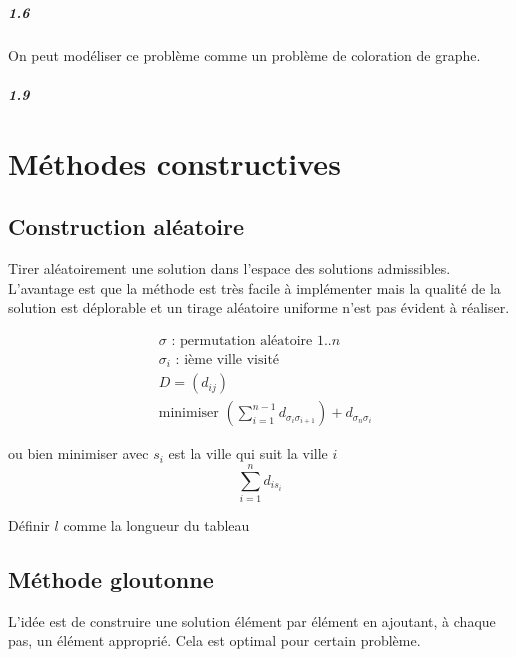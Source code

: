 \documentclass[11pt,a4paper]{report}
\begin{document}
\paragraph*{1.6} On peut modéliser ce problème comme un problème de coloration de graphe.

\paragraph*{1.9} 

\chapter{Méthodes constructives}

\section{Construction aléatoire}
Tirer aléatoirement une solution dans l'espace des solutions admissibles. L'avantage est que la méthode est très facile à implémenter mais la qualité de la solution est déplorable et un tirage aléatoire uniforme n'est pas évident à réaliser.

\begin{align*}
& \sigma \text{ : permutation aléatoire } 1..n \\
& \sigma_i \text{ : ième ville visité}\\
& D = (d_{ij})\\
& \text{minimiser } (\sum_{i=1}^{n-1} d_{\sigma_i \sigma_{i+1}}) + d_{\sigma_n \sigma_i}
\end{align*}

ou bien minimiser avec $s_i$ est la ville qui suit la ville $i$
$$
\sum_{i=1}^n d_{i s_i}
$$

\begin{algorithm}[H]
Définir $l$ comme la longueur du tableau\;
\end{algorithm}

\section{Méthode gloutonne}

L'idée est de construire une solution élément par élément en ajoutant, à chaque pas, un élément approprié. Cela est optimal pour certain problème.
\end{document}
